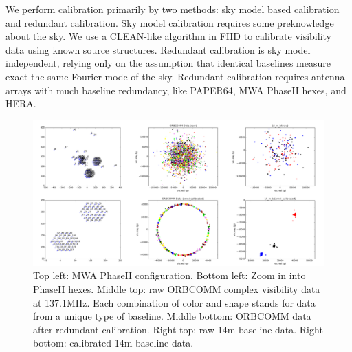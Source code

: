 \documentclass[a0,landscape]{a0poster}
\begin{document}
\begin{multicols}{4}
We perform calibration primarily by two methods: sky model based calibration and redundant calibration. Sky model calibration requires some preknowledge about the sky. We use a CLEAN-like algorithm in FHD to calibrate visibility data using known source structures. Redundant calibration is sky model independent, relying only on the assumption that identical baselines measure exact the same Fourier mode of the sky. Redundant calibration requires antenna arrays with much baseline redundancy, like PAPER64, MWA PhaseII hexes, and HERA.

\begin{figure}[H]
\centering
\label{Redundant calibration on MWA PhaseII ORBCOMM data}
\includegraphics[width=0.85\linewidth]{figures/omnical_on_ORBCOMM.png}
\caption{Top left: MWA PhaseII configuration. Bottom left: Zoom in into PhaseII hexes. Middle top: raw ORBCOMM complex visibility data at 137.1MHz. Each combination of color and shape stands for data from a unique type of baseline. Middle bottom: ORBCOMM data after redundant calibration. Right top: raw 14m baseline data. Right bottom: calibrated 14m baseline data.}
\end{figure}




\end{multicols}
\end{document}
